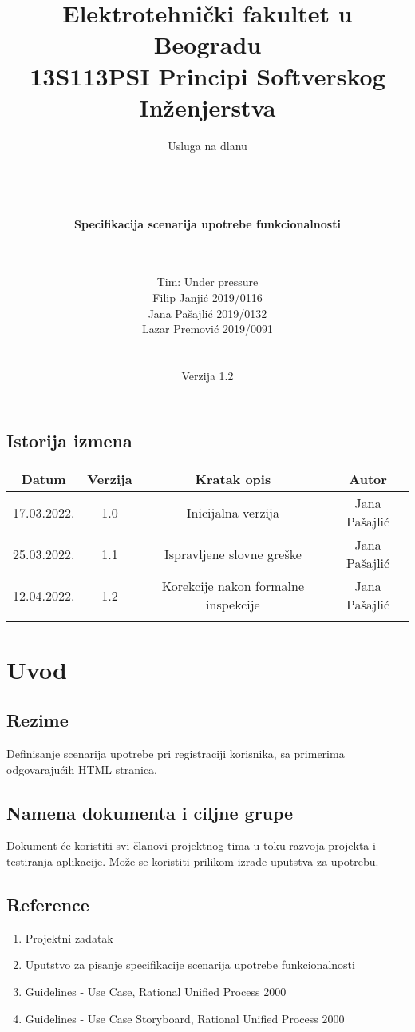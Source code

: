 \documentclass[a4paper,12pt]{report}
\title{\Large Elektrotehnički fakultet u Beogradu \\ 13S113PSI Principi Softverskog Inženjerstva}
\author{\Huge Usluga na dlanu\\ \ \\ \ \\ \ \\ \ \\
	\Large \textbf{Specifikacija scenarija upotrebe funkcionalnosti}\\\Large \textbf{\genitivfunkcionalnosti} \\ \ \\}
\date{\Large   Tim: Under pressure \\ Filip Janjić 2019/0116 \\ Jana Pašajlić 2019/0132 \\ Lazar Premović 2019/0091  \\ \  \\ \  \\\large Verzija 1.2}
\newcommand{\dativfunkcionalnosti }{registraciji korisnika}
\newcommand{\inicijalniautor}{Jana Pašajlić}
\newcommand{\inicijalnidatum}{17.03.2022.}
\begin{document}
\maketitle

\begin{center}
\section*{Istorija izmena}
\begin{tabular}{ |c|c|c|c| }
\hline
\textbf{Datum} & \textbf{Verzija} & \textbf{Kratak opis} & \textbf{Autor} \\ 
\hline
 \inicijalnidatum & 1.0  & Inicijalna verzija & \inicijalniautor \\
 \hline
 25.03.2022. & 1.1  & Ispravljene slovne greške & \inicijalniautor \\
 \hline
 12.04.2022. & 1.2  & Korekcije nakon formalne inspekcije & \inicijalniautor \\
 \hline
 &  &  &  \\
 \hline
\end{tabular}
\end{center}
\newpage

\tableofcontents

\newpage
\section{Uvod}
\subsection{Rezime}
Definisanje scenarija upotrebe pri \dativfunkcionalnosti, sa primerima odgovarajućih HTML stranica.
\subsection{Namena dokumenta i ciljne grupe}
Dokument će koristiti svi članovi projektnog tima u toku razvoja projekta i testiranja aplikacije. Može se koristiti prilikom izrade uputstva za upotrebu.
\subsection{Reference}
    \begin{enumerate}
        \item Projektni zadatak
        \item Uputstvo za pisanje specifikacije scenarija upotrebe funkcionalnosti 
        \item Guidelines - Use Case, Rational Unified Process 2000
        \item Guidelines - Use Case Storyboard, Rational Unified Process 2000
    \end{enumerate}
\end{document}
